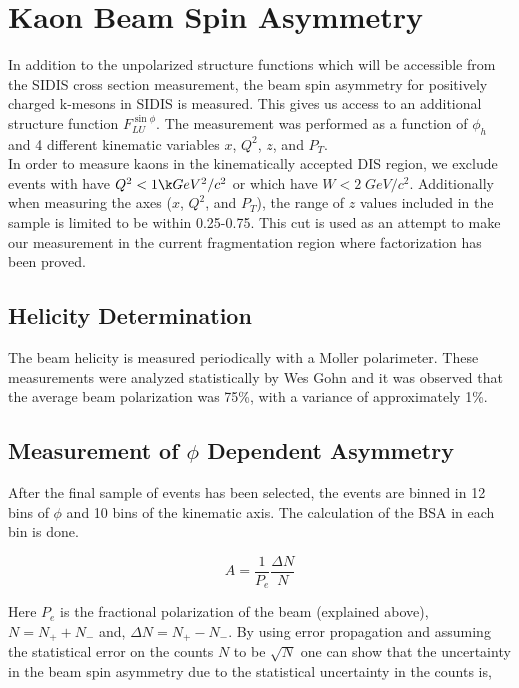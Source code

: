 \section{Kaon Beam Spin Asymmetry}

In addition to the unpolarized structure functions which will be accessible from the SIDIS cross section measurement, the beam spin asymmetry for positively charged k-mesons in SIDIS is measured.  This gives us access to an additional structure function $F_{LU}^{\sin\phi}$.  The measurement was performed as a function of $\phi_h$ and 4 different kinematic variables $x$, $Q^2$, $z$, and $P_T$.  \\

In order to measure kaons in the kinematically accepted DIS region, we exclude events with have $Q^2 < 1 \k GeV^2/c^2$ or which have $W < 2 \; GeV/c^2$.  Additionally when measuring the axes ($x$, $Q^2$, and $P_T$), the range of $z$ values included in the sample is limited to be within 0.25-0.75.  This cut is used as an attempt to make our measurement in the current fragmentation region where factorization has been proved.  

\subsection{Helicity Determination}
The beam helicity is measured periodically with a Moller polarimeter.  These measurements were analyzed statistically by Wes Gohn and it was observed that the average beam polarization was 75\%, with a variance of approximately 1\%.  

\subsection{Measurement of $\phi$ Dependent Asymmetry}
After the final sample of events has been selected, the events are binned in 12 bins of $\phi$ and 10 bins of the kinematic axis.  The calculation of the BSA in each bin is done.

\begin{equation}
  A = \frac{1}{P_e} \frac{\Delta N}{N}
\end{equation}

Here $P_e$ is the fractional polarization of the beam (explained above), $N = N_+ + N_-$ and, $\Delta N = N_+ - N_-$.  By using error propagation and assuming the statistical error on the counts $N$ to be $\sqrt{N}$ one can show that the uncertainty in the beam spin asymmetry due to the statistical uncertainty in the counts is,

